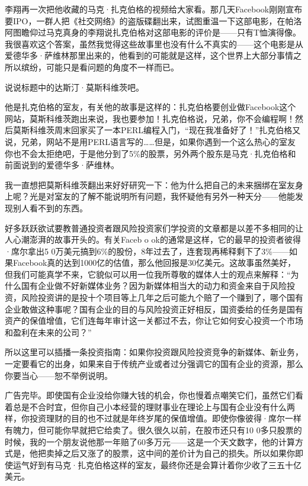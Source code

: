 李翔再一次把他收藏的马克·扎克伯格的视频给大家看。那几天Facebook刚刚宣布要IPO，一群人把《社交网络》的盗版碟翻出来，试图重温一下这部电影，在帕洛阿图瞻仰过马克真身的李翔说扎克伯格对这部电影的评价是------只有T恤演得像。我很喜欢这个答案，虽然我觉得这些故事里也没有什么不真实的------这个电影是从爱德华多·萨维林那里出来的，他看到的可能就是这样，这个世界上大部分事情之所以缤纷，可能只是看问题的角度不一样而已。

说说标题中的达斯汀·莫斯科维茨吧。

他是扎克伯格的室友，有关他的故事是这样的：扎克伯格要创业做Facebook这个网站，莫斯科维茨跑出来说，我也要参加！扎克伯格说，兄弟，你不会编程啊！然后莫斯科维茨周末回家买了一本PERL编程入门，``现在我准备好了！''扎克伯格又说，兄弟，网站不是用PERL语言写的\ldots\ldots 但是，如果你遇到一个这么热心的室友你也不会太拒绝吧，于是他分到了5\%的股票，另外两个股东是马克·扎克伯格和前面说到的爱德华多·萨维林。

我一直想把莫斯科维茨翻出来好好研究一下：他为什么把自己的未来捆绑在室友身上呢？光是对室友的了解不能说明所有问题，我怀疑他有另外一种天分------他能发现别人看不到的东西。

好多跃跃欲试要教普通投资者跟风险投资家们学投资的文章都是以差不多相同的让人心潮澎湃的故事开头的。有关Faceb
o ok的通常是这样，它的最早的投资者彼得·席尔拿出5
0万美元搞到6\%的股份，8年过去了，连套现再稀释剩下了3\%------如果Facebook真的达到1000亿的估值，那么他回报是30亿美元。这故事虽然美好，但我们可能真学不来，它貌似可以用一位我所尊敬的媒体人士的观点来解释：``为什么国有企业做不好新媒体业务？因为新媒体相当大的动力和资金来自于风险投资，风险投资讲的是投十个项目等上几年之后可能九个赔了一个赚到了，哪个国有企业敢做这种事呢？国有企业的目的与风险投资正好相反，国资委给的任务是国有资产的保值增值，它们连每年审计这一关都过不去，你让它如何安心投资一个市场和盈利在未来的公司？''

所以这里可以插播一条投资指南：如果你投资跟风险投资竞争的新媒体、新业务，一定要看它的出身，如果来自于传统产业或者过分强调它的国有企业的资源，那么你要当心------恕不举例说明。

广告完毕。即使国有企业没给你赚大钱的机会，你也慢着点嘲笑它们，虽然它们看着总是不合时宜，但你自己小本经营的理财事业在理论上与国有企业没有什么两样，你投资理财的目的也不过就是年终岁尾的保值增值。即使你像彼得·席尔一样有魄力，但可能你早就把它给卖了。很久很久以前，在股市还只有10
0多只股票的时候，我的一个朋友说他那一年赔了60多万元------这是一个天文数字，他的计算方式是，他把卖掉之后又涨了的股票，这中间的差价计为自己的损失。所以如果你即使运气好到有马克·扎克伯格这样的室友，最终你还是会算计着你少收了三五十亿美元。

